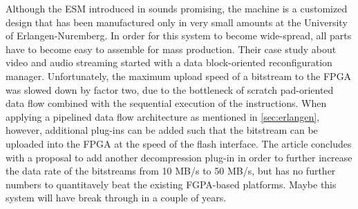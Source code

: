 Although the ESM introduced in \cite{erlangen} sounds promising, the machine is a customized design that has been manufactured only in very small amounts at the University of Erlangen-Nuremberg. In order for this system to become wide-spread, all parts have to become easy to assemble for mass production. Their case study about video and audio streaming started with a data block-oriented reconfiguration manager. Unfortunately, the maximum upload speed of a bitstream to the FPGA was slowed down by factor two, due to the bottleneck of scratch pad-oriented data flow combined with the sequential execution of the instructions. When applying a pipelined data flow architecture as mentioned in \ref{sec:erlangen}, however, additional plug-ins can be added such that the bitstream can be uploaded into the FPGA at the speed of the flash interface. The article concludes with a proposal to add another decompression plug-in in order to further increase the data rate of the bitstreams from 10 MB/s to 50 MB/s, but has no further numbers to quantitavely beat the existing FGPA-based platforms. Maybe this system will have break through in a couple of years.

